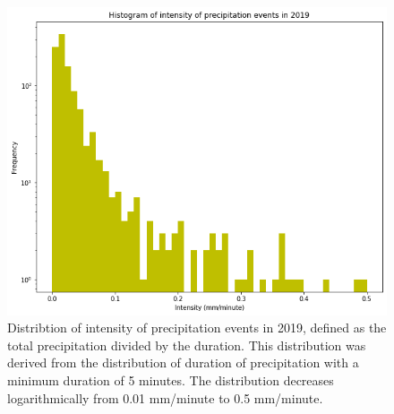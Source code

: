%
	\vfill 
	\begin{figure}[h]
		\centering
		\includegraphics[width=150mm]{../Figures/intensity_hist_5min.png}
		\caption{Distribtion of intensity of precipitation events in 2019, defined as the total precipitation divided by the duration. This distribution was derived from the distribution of duration of precipitation with a minimum duration of 5 minutes. The distribution decreases logarithmically from 0.01 mm/minute to 0.5 mm/minute.}
	\end{figure}
\vfill
